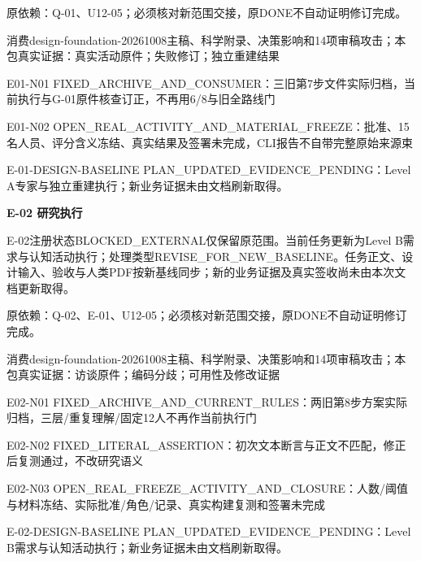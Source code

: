 \documentclass[11pt,a4paper]{article}
\newcommand{\reviewsection}[1]{\par\Needspace{5\baselineskip}\vspace{10pt}\begin{center}{\titlelatin\titlecjk\bfseries\fontsize{14}{20}\selectfont #1}\end{center}}
\begin{document}
原依赖：Q-\allowbreak{}01、U12-\allowbreak{}05；必须核对新范围交接，原DONE不自动证明修订完成。


消费design-\allowbreak{}foundation-\allowbreak{}20261008主稿、科学附录、决策影响和14项审稿攻击；本包真实证据：真实活动原件；失败修订；独立重建结果


E01-\allowbreak{}N01 FIXED\_\allowbreak{}ARCHIVE\_\allowbreak{}AND\_\allowbreak{}CONSUMER：三旧第7步文件实际归档，当前执行与G-\allowbreak{}01原件核查订正，不再用6/\allowbreak{}8与旧全路线门


E01-\allowbreak{}N02 OPEN\_\allowbreak{}REAL\_\allowbreak{}ACTIVITY\_\allowbreak{}AND\_\allowbreak{}MATERIAL\_\allowbreak{}FREEZE：批准、15名人员、评分含义冻结、真实结果及签署未完成，CLI报告不自带完整原始来源束


E-\allowbreak{}01-\allowbreak{}DESIGN-\allowbreak{}BASELINE PLAN\_\allowbreak{}UPDATED\_\allowbreak{}EVIDENCE\_\allowbreak{}PENDING：Level A专家与独立重建执行；新业务证据未由文档刷新取得。


\reviewsection{E-\allowbreak{}02 研究执行}
E-\allowbreak{}02注册状态BLOCKED\_\allowbreak{}EXTERNAL仅保留原范围。当前任务更新为Level B需求与认知活动执行；处理类型REVISE\_\allowbreak{}FOR\_\allowbreak{}NEW\_\allowbreak{}BASELINE。任务正文、设计输入、验收与人类PDF按新基线同步；新的业务证据及真实签收尚未由本次文档更新取得。


原依赖：Q-\allowbreak{}02、E-\allowbreak{}01、U12-\allowbreak{}05；必须核对新范围交接，原DONE不自动证明修订完成。


消费design-\allowbreak{}foundation-\allowbreak{}20261008主稿、科学附录、决策影响和14项审稿攻击；本包真实证据：访谈原件；编码分歧；可用性及修改证据


E02-\allowbreak{}N01 FIXED\_\allowbreak{}ARCHIVE\_\allowbreak{}AND\_\allowbreak{}CURRENT\_\allowbreak{}RULES：两旧第8步方案实际归档，三层/\allowbreak{}重复理解/\allowbreak{}固定12人不再作当前执行门


E02-\allowbreak{}N02 FIXED\_\allowbreak{}LITERAL\_\allowbreak{}ASSERTION：初次文本断言与正文不匹配，修正后复测通过，不改研究语义


E02-\allowbreak{}N03 OPEN\_\allowbreak{}REAL\_\allowbreak{}FREEZE\_\allowbreak{}ACTIVITY\_\allowbreak{}AND\_\allowbreak{}CLOSURE：人数/\allowbreak{}阈值与材料冻结、实际批准/\allowbreak{}角色/\allowbreak{}记录、真实构建复测和签署未完成


E-\allowbreak{}02-\allowbreak{}DESIGN-\allowbreak{}BASELINE PLAN\_\allowbreak{}UPDATED\_\allowbreak{}EVIDENCE\_\allowbreak{}PENDING：Level B需求与认知活动执行；新业务证据未由文档刷新取得。
\end{document}
